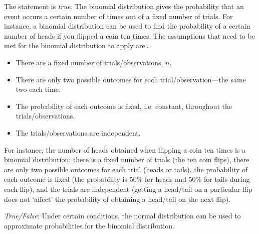 \documentclass[11pt,letterpaper]{article}
\begin{document}
\sol The statement is \textit{true}. The binomial distribution gives the probability that an event occurs a certain number of times out of a fixed number of trials. For instance, a binomial distribution can be used to find the probability of a certain number of heads if you flipped a coin ten times. The assumptions that need to be met for the binomial distribution to apply are\dots
	\begin{itemize}
	\item There are a fixed number of trials/observations, $n$.
	\item There are only two possible outcomes for each trial/observation---the same two each time.
	\item The probability of each outcome is fixed, i.e. constant, throughout the trials/observations.
	\item The trials/observations are independent. 
	\end{itemize}
For instance, the number of heads obtained when flipping a coin ten times is a binomial distribution: there is a fixed number of trials (the ten coin flips), there are only two possible outcomes for each trial (heads or tails), the probability of each outcome is fixed (the probability is 50\% for heads and 50\% for tails during each flip), and the trials are independent (getting a head/tail on a particular flip does not `affect' the probability of obtaining a head/tail on the next flip). \pvspace{1.3cm}



\quizsol \textit{True/False}: Under certain conditions, the normal distribution can be used to approximate probabilities for the binomial distribution. \pspace
\end{document}
